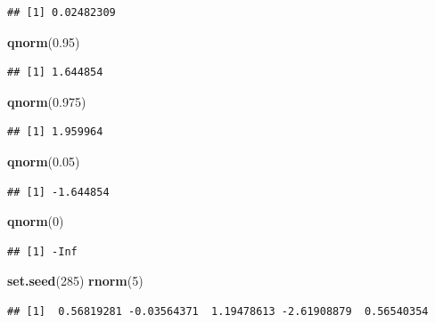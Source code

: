 \documentclass[]{article}
\newenvironment{Shaded}{\begin{snugshade}}{\end{snugshade}}
\newcommand{\DecValTok}[1]{\textcolor[rgb]{0.00,0.00,0.81}{#1}}
\newcommand{\FloatTok}[1]{\textcolor[rgb]{0.00,0.00,0.81}{#1}}
\newcommand{\KeywordTok}[1]{\textcolor[rgb]{0.13,0.29,0.53}{\textbf{#1}}}
\newcommand{\NormalTok}[1]{#1}
\begin{document}
\begin{verbatim}
## [1] 0.02482309
\end{verbatim}

\begin{Shaded}
\begin{Highlighting}[]
\KeywordTok{qnorm}\NormalTok{(}\FloatTok{0.95}\NormalTok{)}
\end{Highlighting}
\end{Shaded}

\begin{verbatim}
## [1] 1.644854
\end{verbatim}

\begin{Shaded}
\begin{Highlighting}[]
\KeywordTok{qnorm}\NormalTok{(}\FloatTok{0.975}\NormalTok{)}
\end{Highlighting}
\end{Shaded}

\begin{verbatim}
## [1] 1.959964
\end{verbatim}

\begin{Shaded}
\begin{Highlighting}[]
\KeywordTok{qnorm}\NormalTok{(}\FloatTok{0.05}\NormalTok{)}
\end{Highlighting}
\end{Shaded}

\begin{verbatim}
## [1] -1.644854
\end{verbatim}

\begin{Shaded}
\begin{Highlighting}[]
\KeywordTok{qnorm}\NormalTok{(}\DecValTok{0}\NormalTok{)}
\end{Highlighting}
\end{Shaded}

\begin{verbatim}
## [1] -Inf
\end{verbatim}

\begin{Shaded}
\begin{Highlighting}[]
\KeywordTok{set.seed}\NormalTok{(}\DecValTok{285}\NormalTok{)}
\KeywordTok{rnorm}\NormalTok{(}\DecValTok{5}\NormalTok{)}
\end{Highlighting}
\end{Shaded}

\begin{verbatim}
## [1]  0.56819281 -0.03564371  1.19478613 -2.61908879  0.56540354
\end{verbatim}
\end{document}
